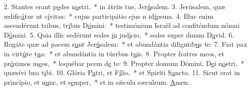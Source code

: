 2. Stantes erant p\uline{e}des n\uline{o}stri,~* in átriis tus, Jer\uline{ú}salem.
3. Jerúsalem, quæ ædific\uline{á}tur ut c\uline{í}vitas:~* cujus participátio ejus n id\uline{í}psum.
4. Illuc enim ascendérunt tribus, tr\uline{i}bus D\uline{ó}mini:~* testimónium Israël ad confiténdum nómni D\uline{ó}mini.
5. Quia illic sedérunt sedes \uline{i}n jud\uline{í}cio,~* sedes super dmum D\uline{a}vid.
6. Rogáte quæ ad pacem s\uline{u}nt Jer\uline{ú}salem:~* et abundántia diligntib\uline{u}s te:
7. Fiat pax in virt\uline{ú}te t\uline{u}a:~* et abundántia in túrrbus t\uline{u}is.
8. Propter fratres meos, et pr\uline{ó}ximos m\uline{e}os,~* loquébar pcem d\uline{e} te:
9. Propter domum Dómini, D\uline{e}i n\uline{o}stri,~* quæsívi bna t\uline{i}bi.
10. Glória P\uline{a}tri, et F\uline{í}lio,~* et Spiríti S\uline{a}ncto.
11. Sicut erat in princípio, et n\uline{u}nc, et s\uline{e}mper,~* et in sǽcula sæculrum. \uline{A}men.
